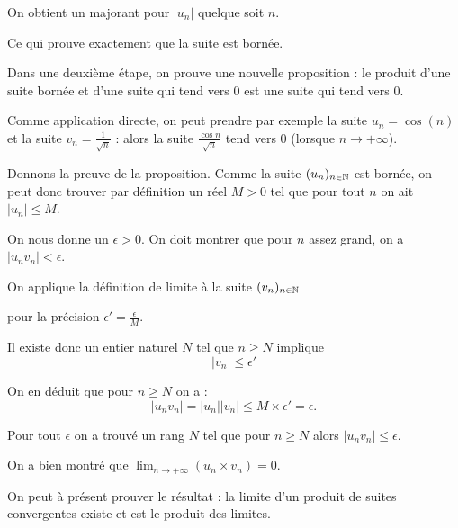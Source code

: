 \change


On obtient un majorant pour $|u_n|$ quelque soit $n$.

Ce qui prouve exactement que la suite est bornée.

 \diapo

Dans une deuxième étape, on prouve une nouvelle proposition : 
le produit d'une suite bornée et d'une suite qui tend vers $0$ est une suite qui tend vers $0$.

\change

Comme application directe, on peut prendre par exemple la suite $u_n=\cos(n)$ 
et la suite $v_n=\frac{1}{\sqrt{n}}$ :
alors la suite $\frac{\cos n}{\sqrt n}$ tend vers $0$ (lorsque $n \to +\infty$).

\change
Donnons la preuve de la proposition.
Comme la suite $(u_n)_{n\in \mathbb{N}}$ est bornée, on peut donc trouver par définition 
un réel $M>0$ tel que pour tout $n$ on ait $\lvert u_n \rvert\leq M$. 

\change

On nous donne un $\epsilon >0$. On doit montrer que pour $n$ assez grand, on a  $\lvert u_nv_n \rvert<\epsilon$.

\change 

On applique la  définition de limite à la suite $(v_n)_{n\in \mathbb{N}}$ 

\change

pour  la précision $\epsilon'=\frac{\epsilon}{M}$.  

\change

Il existe donc un entier naturel $N$ tel que 
$n\geq N$ implique $$ \lvert v_n  \rvert\leq  \epsilon'$$ 


\change

On en déduit que pour  $n\geq N$ on a :
\[ \lvert u_nv_n \rvert= \lvert u_n \rvert \lvert v_n \rvert \leq M\times \epsilon'=\epsilon .\]

\change

Pour tout $\epsilon$ on a trouvé un rang $N$ tel que pour $n\ge N$ alors $|u_n v_n| \le \epsilon$.

On a bien montré que $\lim_{n\to +\infty}\left(u_n\times v_n\right)=0$.


 \diapo

On peut à présent prouver le résultat : la limite d'un produit de suites convergentes existe et est le produit des limites.

